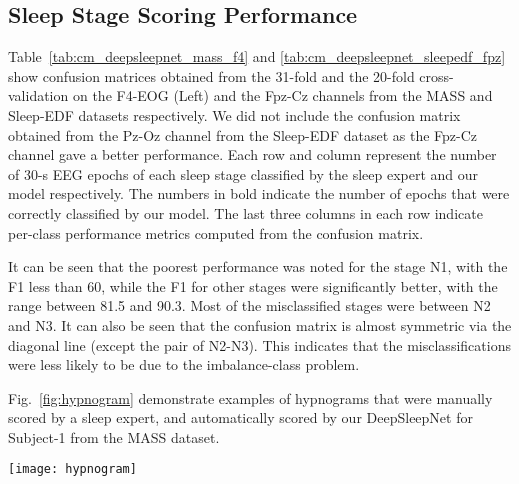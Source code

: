 \documentclass[journal,twoside]{IEEEtran}
\let\MYoriglatexcaption\caption
\renewcommand{\caption}[2][\relax]{\MYoriglatexcaption[#2]{#2}}
\begin{document}
\subsection{Sleep Stage Scoring Performance} \label{sec:performance}
Table~\ref{tab:cm_deepsleepnet_mass_f4} and \ref{tab:cm_deepsleepnet_sleepedf_fpz} show confusion matrices obtained from the 31-fold and the 20-fold cross-validation on the F4-EOG (Left) and the Fpz-Cz channels from the MASS and Sleep-EDF datasets respectively. We did not include the confusion matrix obtained from the Pz-Oz channel from the Sleep-EDF dataset as the Fpz-Cz channel gave a better performance.
Each row and column represent the number of 30-s EEG epochs of each sleep stage classified by the sleep expert and our model respectively. The numbers in bold indicate the number of epochs that were correctly classified by our model. The last three columns in each row indicate per-class performance metrics computed from the confusion matrix.

It can be seen that the poorest performance was noted for the stage N1, with the F1 less than 60, while the F1 for other stages were significantly better, with the range between 81.5 and 90.3.
Most of the misclassified stages were between N2 and N3. It can also be seen that the confusion matrix is almost symmetric via the diagonal line (except the pair of N2-N3). This indicates that the misclassifications were less likely to be due to the imbalance-class problem.

Fig.~\ref{fig:hypnogram} demonstrate examples of hypnograms that were manually scored by a sleep expert, and automatically scored by our DeepSleepNet for Subject-1 from the MASS dataset.

\begin{figure*}[!t]
\centering
\texttt{[image: hypnogram]}
\caption{Examples of the hypnogram manually scored by a sleep expert (top) and the hypnogram automatically scored by DeepSleepNet (bottom) for Subject-1 from the MASS dataset.}
\label{fig:hypnogram}
\end{figure*}
\end{document}
